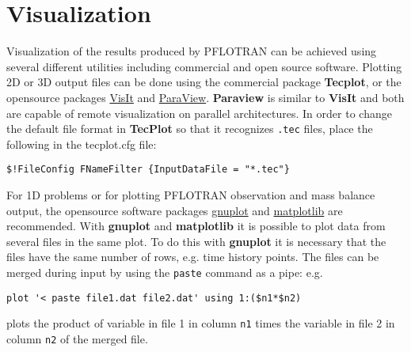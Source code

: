 
\section{Visualization}

Visualization of the results produced by PFLOTRAN can be achieved using several different utilities including commercial and open source software. 
Plotting 2D or 3D output files can be done using the commercial package {\bf Tecplot}, or the opensource packages \href{https://wci.llnl.gov/codes/visit/}{VisIt} and \href{http://www.paraview.org/}{ParaView}. {\bf Paraview} is similar to {\bf VisIt} and both are capable of remote visualization on parallel architectures.  In order to change the default file format in {\bf TecPlot} so that it recognizes {\tt .tec} files, place the following in the tecplot.cfg file:

\verb|$!FileConfig FNameFilter {InputDataFile = "*.tec"}|

For 1D problems or for plotting PFLOTRAN observation and mass balance output, the opensource software packages \href{http://www.gnuplot.info/}{gnuplot} and \href{http://matplotlib.org/}{matplotlib} are recommended.
With {\bf gnuplot} and {\bf matplotlib} it is possible to plot data from several files in the same plot.
To do this with {\bf gnuplot} it is necessary that the files have the same number of rows, e.g. time history points. The files can be merged during input by using the {\tt paste} command as a pipe: e.g.

\verb|plot '< paste file1.dat file2.dat' using 1:($n1*$n2)|

\noindent
plots the product of variable in file 1 in column {\tt n1} times the variable in file 2 in column {\tt n2} of the merged file.
